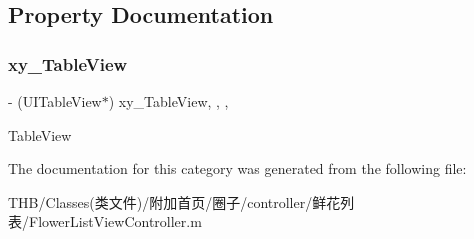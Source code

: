 \subsection{Property Documentation}
\mbox{\label{category_flower_list_view_controller_07_08_a648a1b8763a8c1c684bbaa0a4f658c57}} 
\subsubsection{\texorpdfstring{xy\+\_\+\+Table\+View}{xy\_TableView}}
{\footnotesize\ttfamily -\/ (U\+I\+Table\+View$\ast$) xy\+\_\+\+Table\+View\hspace{0.3cm}{\ttfamily [read]}, {\ttfamily [write]}, {\ttfamily [nonatomic]}, {\ttfamily [strong]}}

Table\+View 

The documentation for this category was generated from the following file\+:\begin{DoxyCompactItemize}
\item 
T\+H\+B/\+Classes(类文件)/附加首页/圈子/controller/鲜花列表/Flower\+List\+View\+Controller.\+m\end{DoxyCompactItemize}
